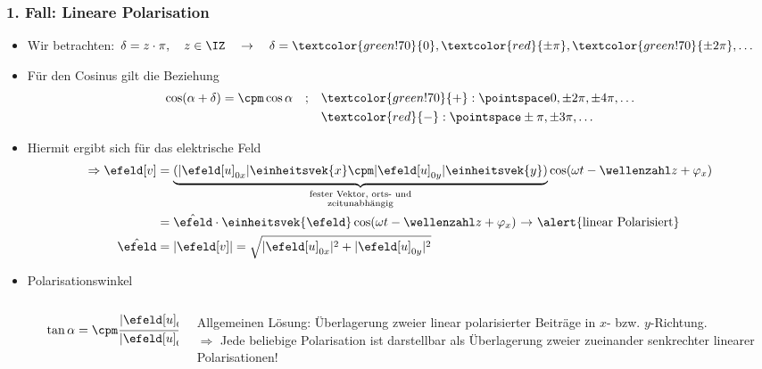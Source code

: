 \begin{frame}
  \frametitle{1. Fall: Lineare Polarisation}
  \begin{itemize}[<+->]
  \item Wir betrachten: \(\delta = z \cdot \pi ,\quad z \in \IZ\quad\rightarrow\quad \delta = \textcolor{green!70}{0}, \textcolor{red}{\pm \pi} , \textcolor{green!70}{\pm 2\pi}, \ldots\)
 \item Für den Cosinus gilt die Beziehung  
    \begin{align*}
\begin{split}
\cos ( \alpha + \delta ) = \cpm \cos \alpha \quad;\quad &\textcolor{green!70}{+} : \pointspace 0,\pm 2\pi, \pm 4\pi, \ldots\\
& \textcolor{red}{-} : \pointspace \pm \pi, \pm 3\pi, \ldots
\end{split}
\end{align*}
\item Hiermit ergibt sich für das elektrische Feld
\begin{align*}
  \Rightarrow \efeld[v]&= \underbrace{(\vert \efeld[u]_{0x} \vert \einheitsvek{x} \cpm \vert \efeld[u]_{0y}\vert \einheitsvek{y})}_{\substack{\text{fester Vektor, orts- und}\\ \text{zeitunabhängig}}} \cos (\omega t - \wellenzahl z + \varphi_x)\\
  &= \hat{\efeld}\cdot \einheitsvek{\efeld}\cos (\omega t - \wellenzahl z + \varphi_x ) \text{ \(\to\) \alert{linear Polarisiert}}\\
  \hat{\efeld} &= \vert \efeld[v] \vert = \sqrt{\vert \efeld[u]_{0x} \vert ^2 + \vert \efeld[u]_{0y} \vert ^2}
\end{align*}
\item \alert{Polarisationswinkel}
  \begin{columns}
    \begin{column}{.2\linewidth}
      \hspace*{1cm}
      \end{column}
      \begin{column}{.2\linewidth}
        \(\tan \alpha = \cpm \dfrac{|\efeld[u]_{0y}|}{|\efeld[u]_{0x}|}\)
      \end{column}
      \begin{column}{.6\linewidth}
Allgemeinen Lösung: Überlagerung zweier linear polarisierter Beiträge in \(x\)- bzw. \(y\)-Richtung.\\
\(\Rightarrow\) \alert{Jede beliebige Polarisation ist darstellbar als Überlagerung zweier zueinander senkrechter linearer Polarisationen!}
\end{column}
    \end{columns}
  \end{itemize}
  \ 
\end{frame}

